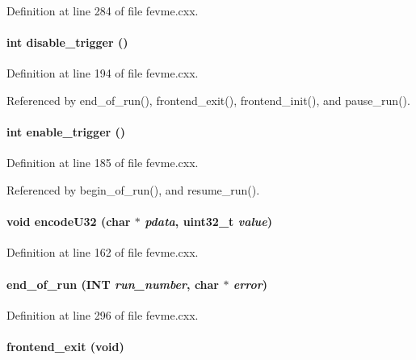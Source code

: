 Definition at line 284 of file fevme.cxx.
\paragraph[{disable\_\-trigger}]{\setlength{\rightskip}{0pt plus 5cm}int disable\_\-trigger ()}\hfill\label{fevme_8cxx_a3d65a1ad11c020dbf20ddf6ade6660eb}


Definition at line 194 of file fevme.cxx.

Referenced by end\_\-of\_\-run(), frontend\_\-exit(), frontend\_\-init(), and pause\_\-run().
\paragraph[{enable\_\-trigger}]{\setlength{\rightskip}{0pt plus 5cm}int enable\_\-trigger ()}\hfill\label{fevme_8cxx_a9adc7f23bca3d3aa04dbaa13b8b9bc7e}


Definition at line 185 of file fevme.cxx.

Referenced by begin\_\-of\_\-run(), and resume\_\-run().
\paragraph[{encodeU32}]{\setlength{\rightskip}{0pt plus 5cm}void encodeU32 (char $\ast$ {\em pdata}, \/  uint32\_\-t {\em value})}\hfill\label{fevme_8cxx_a616a2b18f0e3af14cb5fe04c682539bb}


Definition at line 162 of file fevme.cxx.
\paragraph[{end\_\-of\_\-run}]{ end\_\-of\_\-run ({\bf INT} {\em run\_\-number}, \/  char $\ast$ {\em error})}\hfill\label{fevme_8cxx_ae6d798649008b7523c77222bae2d4187}


Definition at line 296 of file fevme.cxx.
\paragraph[{frontend\_\-exit}]{ frontend\_\-exit (void)}\hfill\label{fevme_8cxx_a15271255cca6c92978b28afd5a548382}


